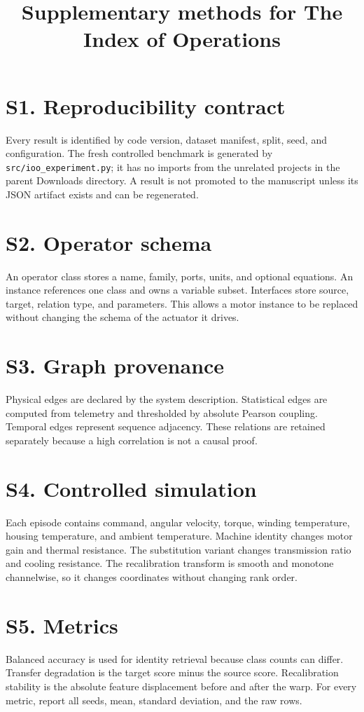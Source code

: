 \documentclass[11pt]{article}
\title{Supplementary methods for The Index of Operations}
\author{}
\date{}
\begin{document}
\maketitle
\section*{S1. Reproducibility contract}
Every result is identified by code version, dataset manifest, split, seed, and configuration. The fresh controlled benchmark is generated by \texttt{src/ioo\_experiment.py}; it has no imports from the unrelated projects in the parent Downloads directory. A result is not promoted to the manuscript unless its JSON artifact exists and can be regenerated.
\section*{S2. Operator schema}
An operator class stores a name, family, ports, units, and optional equations. An instance references one class and owns a variable subset. Interfaces store source, target, relation type, and parameters. This allows a motor instance to be replaced without changing the schema of the actuator it drives.
\section*{S3. Graph provenance}
Physical edges are declared by the system description. Statistical edges are computed from telemetry and thresholded by absolute Pearson coupling. Temporal edges represent sequence adjacency. These relations are retained separately because a high correlation is not a causal proof.
\section*{S4. Controlled simulation}
Each episode contains command, angular velocity, torque, winding temperature, housing temperature, and ambient temperature. Machine identity changes motor gain and thermal resistance. The substitution variant changes transmission ratio and cooling resistance. The recalibration transform is smooth and monotone channelwise, so it changes coordinates without changing rank order.
\section*{S5. Metrics}
Balanced accuracy is used for identity retrieval because class counts can differ. Transfer degradation is the target score minus the source score. Recalibration stability is the absolute feature displacement before and after the warp. For every metric, report all seeds, mean, standard deviation, and the raw rows.
\end{document}
